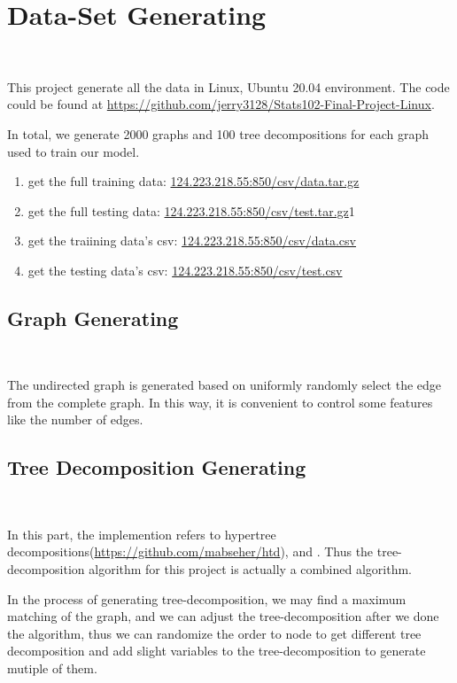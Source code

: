 \section{Data-Set Generating}~\label{sec.DataGen}

This project generate all the data in Linux, Ubuntu 20.04 environment. The code could be found at \url{https://github.com/jerry3128/Stats102-Final-Project-Linux}.

In total, we generate 2000 graphs and 100 tree decompositions for each graph used to train our model.

\begin{enumerate}
    \item get the full training data: \url{124.223.218.55:850/csv/data.tar.gz}
    \item get the full testing data: \url{124.223.218.55:850/csv/test.tar.gz}1
    \item get the traiining data's csv: \url{124.223.218.55:850/csv/data.csv}
    \item get the testing data's csv: \url{124.223.218.55:850/csv/test.csv}
\end{enumerate}

\subsection{Graph Generating}~\label{sec.DataGen1}

The undirected graph is generated based on uniformly randomly select the edge from the complete graph. In this way, it is convenient to control some features like the number of edges.

\subsection{Tree Decomposition Generating}~\label{sec.DataGen2}

In this part, the implemention refers to hypertree decompositions(\url{https://github.com/mabseher/htd}), and \cite{BHL1996LinearTreeDeomposition}. Thus the tree-decomposition algorithm for this project is actually a combined algorithm.

In the process of generating tree-decomposition, we may find a maximum matching of the graph, and we can adjust the tree-decomposition after we done the algorithm, thus we can randomize the order to node to get different tree decomposition and add slight variables to the tree-decomposition to generate mutiple of them.

